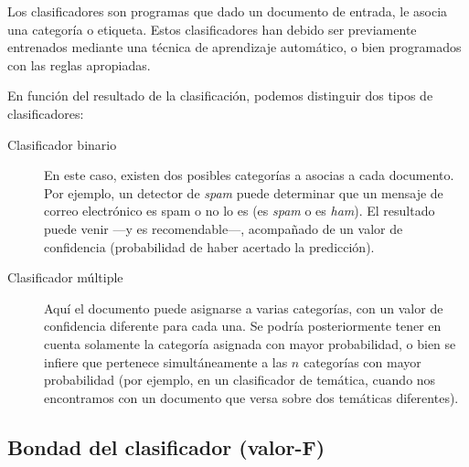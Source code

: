 Los clasificadores son programas que dado un documento de entrada, le asocia una categoría o etiqueta. Estos clasificadores han debido ser previamente entrenados mediante una técnica de aprendizaje automático, o bien programados con las reglas apropiadas.

En función del resultado de la clasificación, podemos distinguir dos tipos de clasificadores:
\nopagebreak
\begin{description}
\item[Clasificador binario] En este caso, existen dos posibles categorías a asocias a cada documento. Por ejemplo, un detector de \emph{spam} puede determinar que un mensaje de correo electrónico es spam o no lo es (es \emph{spam} o es \emph{ham}). El resultado puede venir ---y es recomendable---, acompañado de un valor de confidencia (probabilidad de haber acertado la predicción).
\item[Clasificador múltiple] Aquí el documento puede asignarse a varias categorías, con un valor de confidencia diferente para cada una. Se podría posteriormente tener en cuenta solamente la categoría asignada con mayor probabilidad, o bien se infiere que pertenece simultáneamente a las $n$ categorías con mayor probabilidad (por ejemplo, en un clasificador de temática, cuando nos encontramos con un documento que versa sobre dos temáticas diferentes).
\end{description}


\subsection{Bondad del clasificador (valor-F)}

